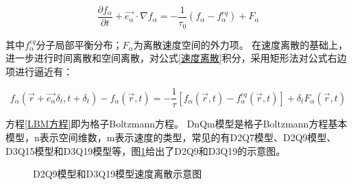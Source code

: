 \begin{equation}
\label{速度离散}
\frac{\partial f_{\alpha}}{\partial t}+\overrightarrow{e_{\alpha}} \cdot \nabla f_{\alpha}=-\frac{1}{\tau_{0}}\left(f_{\alpha}-f_{\alpha}^{e q}\right)+F_{\alpha}\end{equation}

\noindent 其中$f_{\alpha}^{e q}$分子局部平衡分布；$F_{\alpha}$为离散速度空间的外力项。
在速度离散的基础上，进一步进行时间离散和空间离散，对公式\ref{速度离散}积分，采用矩形法对公式右边项进行逼近有：

\begin{equation}
\label{LBM方程}
f_{\alpha}\left(\vec{r}+\overrightarrow{e_{\alpha}} \delta_{t}, t+\delta_{t}\right)-f_{\alpha}(\vec{r}, t)=-\frac{1}{\tau}\left[f_{\alpha}(\vec{r}, t)-f_{\alpha}^{e q}(\vec{r}, t)\right]+\delta_{t} F_{\alpha}(\vec{r}, t)\end{equation}

方程\ref{LBM方程}即为格子Boltzmann方程。
DnQm模型\cite{Y1992Lattice}是格子Boltzmann方程基本模型，n表示空间维数，m表示速度的类型，常见的有D2Q7模型、D2Q9模型、D3Q15模型和D3Q19模型等，图\ref{fig:dnqm}给出了D2Q9和D3Q19的示意图。


\begin{figure}[htb]
	\centering
	 \qquad
	\caption{D2Q9模型和D3Q19模型速度离散示意图}
	\label{fig:dnqm}
\end{figure}

